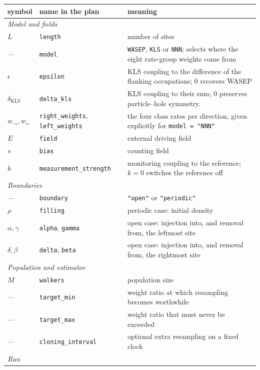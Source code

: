 \documentclass[11pt]{article}
\begin{document}
\begin{center}
\begin{tabular}{llp{7.4cm}}
\hline
symbol & name in the plan & meaning \\
\hline
\multicolumn{3}{l}{\emph{Model and fields}} \\
$L$ & \texttt{length} & number of sites \\
--- & \texttt{model} & \texttt{WASEP}, \texttt{KLS} or \texttt{NNN}; selects
    where the eight rate-group weights come from \\
$\epsilon$ & \texttt{epsilon} & KLS coupling to the difference of the flanking
    occupations; $0$ recovers WASEP \\
$\delta_{\text{KLS}}$ & \texttt{delta\_kls} & KLS coupling to their sum; $0$
    preserves particle--hole symmetry.  \\
$w_\rightarrow, w_\leftarrow$ & \texttt{right\_weights},
    \texttt{left\_weights} & the four class rates per direction, given
    explicitly for \texttt{model = "NNN"} \\
$E$ & \texttt{field} & external driving field \\
$s$ & \texttt{bias} & counting field  \\
$k$ & \texttt{measurement\_strength} & monitoring coupling to the reference;
    $k = 0$ switches the reference off \\
\hline
\multicolumn{3}{l}{\emph{Boundaries}} \\
--- & \texttt{boundary} & \texttt{"open"} or \texttt{"periodic"} \\
$\rho$ & \texttt{filling} & periodic case: initial density \\
$\alpha, \gamma$ & \texttt{alpha}, \texttt{gamma} & open case:
    injection into, and removal from, the leftmost site \\
$\delta, \beta$ & \texttt{delta}, \texttt{beta} & open case: injection into,
    and removal from, the rightmost site \\
\hline
\multicolumn{3}{l}{\emph{Population and estimator}} \\
$M$ & \texttt{walkers} & population size \\
--- & \texttt{target\_min} & weight ratio at which resampling becomes
    worthwhile \\
--- & \texttt{target\_max} & weight ratio that must never be exceeded \\
--- & \texttt{cloning\_interval} & optional extra resampling on a fixed clock \\
\hline
\multicolumn{3}{l}{\emph{Run}} \\

\end{tabular}
\end{center}
\end{document}
